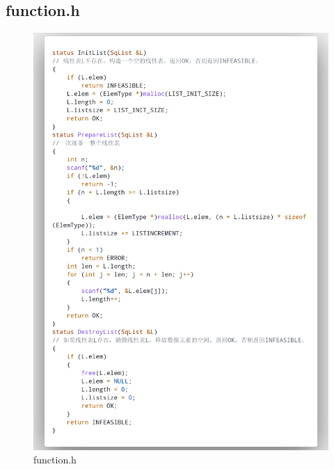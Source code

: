 \documentclass[supercite]{Experimental_Report}
\theoremstyle{definition}
\begin{document}
\subsection{function.h}

\begin{figure}[htb]
	\begin{center}
		\includegraphics[scale=0.30]{images/3-2.png}
		\caption{function.h}
		\label{fig3-2}
	\end{center}
\end{figure}
\end{document}
